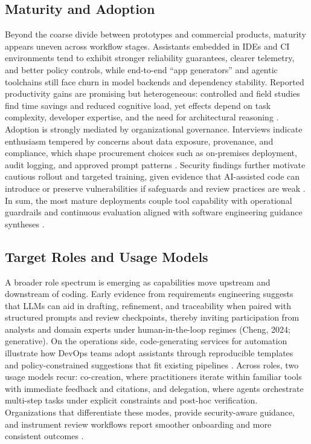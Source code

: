 \subsection{Maturity and Adoption}

Beyond the coarse divide between prototypes and commercial products, maturity appears uneven across workflow stages. Assistants embedded in IDEs and CI environments tend to exhibit stronger reliability guarantees, clearer telemetry, and better policy controls, while end-to-end “app generators” and agentic toolchains still face churn in model backends and dependency stability. Reported productivity gains are promising but heterogeneous: controlled and field studies find time savings and reduced cognitive load, yet effects depend on task complexity, developer expertise, and the need for architectural reasoning \cite{peng2023impact,becker2025measuring}. Adoption is strongly mediated by organizational governance. Interviews indicate enthusiasm tempered by concerns about data exposure, provenance, and compliance, which shape procurement choices such as on-premises deployment, audit logging, and approved prompt patterns \cite{klemmer2024using}. Security findings further motivate cautious rollout and targeted training, given evidence that AI-assisted code can introduce or preserve vulnerabilities if safeguards and review practices are weak \cite{perry2023users,asare2024user}. In sum, the most mature deployments couple tool capability with operational guardrails and continuous evaluation aligned with software engineering guidance syntheses \cite{hou2024large}.

\subsection{Target Roles and Usage Models}

A broader role spectrum is emerging as capabilities move upstream and downstream of coding. Early evidence from requirements engineering suggests that LLMs can aid in drafting, refinement, and traceability when paired with structured prompts and review checkpoints, thereby inviting participation from analysts and domain experts under human-in-the-loop regimes (Cheng, 2024; generative). On the operations side, code-generating services for automation illustrate how DevOps teams adopt assistants through reproducible templates and policy-constrained suggestions that fit existing pipelines \cite{sahoo2024ansible}. Across roles, two usage models recur: co-creation, where practitioners iterate within familiar tools with immediate feedback and citations, and delegation, where agents orchestrate multi-step tasks under explicit constraints and post-hoc verification. Organizations that differentiate these modes, provide security-aware guidance, and instrument review workflows report smoother onboarding and more consistent outcomes \cite{klemmer2024using}.

